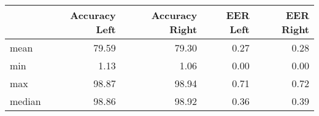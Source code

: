 \begin{tabular}{lrrrr}
\toprule
{} &  Accuracy Left &  Accuracy Right &  EER Left &  EER Right \\
\midrule
mean   &          79.59 &           79.30 &      0.27 &       0.28 \\
min    &           1.13 &            1.06 &      0.00 &       0.00 \\
max    &          98.87 &           98.94 &      0.71 &       0.72 \\
median &          98.86 &           98.92 &      0.36 &       0.39 \\
\bottomrule
\end{tabular}

